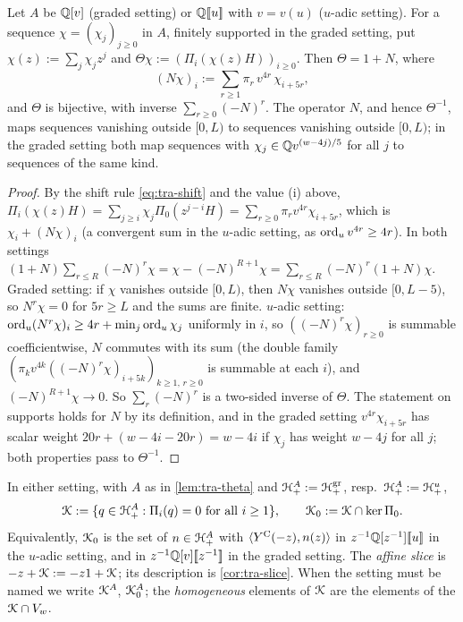 \begin{lem}
\label{lem:tra-theta}
Let $A$ be $\mathbb{Q}[v]$ (graded setting) or $\mathbb{Q}[\![ u ]\!]$ with $v = v(u)$ ($u$-adic setting). For a sequence $\chi = (\chi_j)_{j\geq 0}$ in $A$, finitely supported in the graded setting, put $\chi(z) := \sum_j\chi_jz^j$ and $\Theta\chi := (\Pi_i(\chi(z)H))_{i\geq 0}$. Then $\Theta = 1+N$, where
\[
(N\chi)_i := \sum_{r\geq 1}\pi_r\,v^{4r}\,\chi_{i+5r},
\]
and $\Theta$ is bijective, with inverse $\sum_{r\geq 0}(-N)^r$. The operator $N$, and hence $\Theta^{-1}$, maps sequences vanishing outside $[0,L)$ to sequences vanishing outside $[0,L)$; in the graded setting both map sequences with $\chi_j\in\mathbb{Q} v^{(w-4j)/5}$ for all $j$ to sequences of the same kind.
\end{lem}

\begin{proof}
By the shift rule \eqref{eq:tra-shift} and the value (i) above, $\Pi_i(\chi(z)H) =\sum_{j\geq i}\chi_j\Pi_0(z^{j-i}H) = \sum_{r\geq 0}\pi_rv^{4r}\chi_{i+5r}$, which is $\chi_i+(N\chi)_i$ (a convergent sum in the $u$-adic setting, as $\operatorname{ord}_uv^{4r}\geq 4r$). In both settings $(1+N)\sum_{r\leq R}(-N)^r\chi = \chi-(-N)^{R+1}\chi = \sum_{r\leq R}(-N)^r(1+N)\chi$. Graded setting: if $\chi$ vanishes outside $[0,L)$, then $N\chi$ vanishes outside $[0,L-5)$, so $N^r\chi = 0$ for $5r\geq L$ and the sums are finite. $u$-adic setting: $\operatorname{ord}_u(N^r\chi)_i\geq 4r+\min_j\operatorname{ord}_u\chi_j$ uniformly in $i$, so $((-N)^r\chi)_{r\geq 0}$ is summable coefficientwise, $N$ commutes with its sum (the double family $(\pi_kv^{4k}((-N)^r\chi)_{i+5k})_{k\geq 1,\,r\geq 0}$ is summable at each $i$), and $(-N)^{R+1}\chi\to 0$. So $\sum_r(-N)^r$ is a two-sided inverse of $\Theta$. The statement on supports holds for $N$ by its definition, and in the graded setting $v^{4r}\chi_{i+5r}$ has scalar weight $20r+(w-4i-20r) = w-4i$ if $\chi_j$ has weight $w-4j$ for all $j$; both properties pass to $\Theta^{-1}$.
\end{proof}

\begin{defn}
\label{def:tra-slice}
In either setting, with $A$ as in \cref{lem:tra-theta} and $\mathcal{H}^A_+ := \mathcal{H}^{\mathrm{gr}}_+$, resp.\ $\mathcal{H}^A_+ := \mathcal{H}^u_+$,
\begin{equation}
\label{eq:tra-slice}
\mathcal{K} := \{q\in\mathcal{H}^A_+ : \Pi_i(q) = 0\ \text{for all } i\geq 1\},\qquad \mathcal{K}_{0} := \mathcal{K}\cap\ker\Pi_0 .
\end{equation}
Equivalently, $\mathcal{K}_{0}$ is the set of $n\in\mathcal{H}^A_+$ with $\langle Y^{\mathrm{C}}(-z),n(z)\rangle$ in $z^{-1}\mathbb{Q}[z^{-1}][\![ u ]\!]$ in the $u$-adic setting, and in $z^{-1}\mathbb{Q}[v][\![ z^{-1} ]\!]$ in the graded setting. The \emph{affine slice} is $-z+\mathcal{K} := -z1+\mathcal{K}$; its description is \cref{cor:tra-slice}. When the setting must be named we write $\mathcal{K}^A$, $\mathcal{K}_{0}^A$; the \emph{homogeneous} elements of $\mathcal{K}$ are the elements of the $\mathcal{K}\cap V_w$.
\end{defn}


